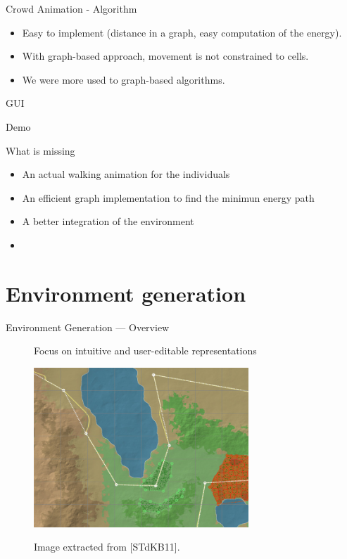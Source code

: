 \documentclass{beamer}
\begin{document}
\begin{frame}{Crowd Animation - Algorithm}
\begin{itemize}
  \item Easy to implement (distance in a graph, easy computation of the energy).
  \item With graph-based approach, movement is not constrained to cells.
  \item We were more used to graph-based algorithms.
\end{itemize}
\end{frame}

\begin{frame}{GUI}


\end{frame}

\begin{frame}{Demo}
\end{frame}

\begin{frame}{What is missing}
  \begin{itemize}
  \item An actual walking animation for the individuals
  \item An efficient graph implementation to find the minimun energy path
  \item A better integration of the environment
  \item 
  \end{itemize}
\end{frame}

\section{Environment generation}
\begin{frame}{Environment Generation --- Overview}
  \begin{figure}
    \begin{center}
      Focus on intuitive and user-editable representations

      \includegraphics[height=6cm]{input_map.png}

      \tiny Image extracted from [STdKB11].
    \end{center}
  \end{figure}
\end{frame}
\end{document}
